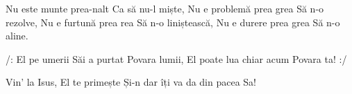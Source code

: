 \beginverse
Nu este munte prea-nalt
Ca să nu-l miște,
Nu e problemă prea grea
Să n-o rezolve,
Nu e furtună prea rea
Să n-o liniștească,
Nu e durere prea grea
Să n-o aline.
\endverse

\beginchorus
/: El pe umerii Săi a purtat
Povara lumii,
El poate lua chiar acum
Povara ta! :/
\endchorus

\beginverse*
Vin’ la Isus, El te primește
Și-n dar îți va da din pacea Sa!
\endverse
\endsong
